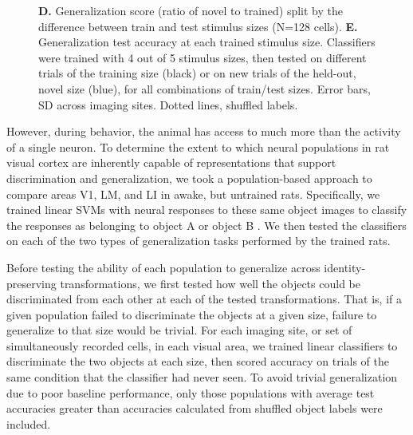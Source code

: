 \begin{figure}[t!]
{    \textbf{D.} Generalization score (ratio of novel to trained) split by the difference between train and test stimulus sizes (N=128 cells).
    \textbf{E.} Generalization test accuracy at each trained stimulus size. Classifiers were trained with 4 out of 5 stimulus sizes, then tested on different trials of the training size (black) or on new trials of the held-out, novel size (blue), for all combinations of train/test sizes. Error bars, SD across imaging sites. Dotted lines, shuffled labels.
    \label{fig:neural_generalization}}
\end{figure}


However, during behavior, the animal has access to much more than the activity of a single neuron. To determine the extent to which neural populations in rat visual cortex are inherently capable of representations that support discrimination and generalization, we took a population-based approach to compare areas V1, LM, and LI in awake, but untrained rats. Specifically, we trained linear SVMs with neural responses to these same object images to classify the responses as belonging to object A or object B \cite{Hung2005, Li2009, Rust2010SelectivityIT}. We then tested the classifiers on each of the two types of generalization tasks performed by the trained rats. 

Before testing the ability of each population to generalize across identity-preserving transformations, we first tested how well the objects could be discriminated from each other at each of the tested transformations. That is, if a given population failed to discriminate the objects at a given size, failure to generalize to that size would be trivial. For each imaging site, or set of simultaneously recorded cells, in each visual area, we trained linear classifiers to discriminate the two objects at each size, then scored accuracy on trials of the same condition that the classifier had never seen. To avoid trivial generalization due to poor baseline performance, only those populations with average test accuracies greater than accuracies calculated from shuffled object labels were included. 

